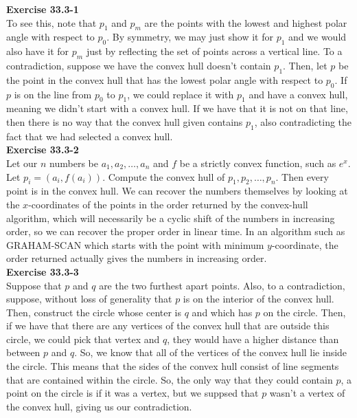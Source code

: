 \documentclass{article}
\begin{document}
\noindent\textbf{Exercise 33.3-1}\\

To see this, note that $p_1$ and $p_m$ are the points with the lowest and highest polar angle with respect to $p_0$. By symmetry, we may just show it for $p_1$ and we would also have it for $p_m$ just by reflecting the set of points across a vertical line. To a contradiction, suppose we have the convex hull doesn't contain $p_1$. Then, let $p$ be the point in the convex hull that has the lowest polar angle with respect to $p_0$. If $p$ is on the line from $p_0$ to $p_1$, we could replace it with $p_1$ and have a convex hull, meaning we didn't start with a convex hull. If we have that it is not on that line, then there is no way that the convex hull given contains $p_1$, also contradicting the fact that we had selected a convex hull.\\

\noindent\textbf{Exercise 33.3-2}\\

Let our $n$ numbers be $a_1, a_2, \ldots, a_n$ and $f$ be a strictly convex function, such as $e^x$.  Let $p_i = (a_i, f(a_i))$.  Compute the convex hull of $p_1, p_2, \ldots, p_n$.  Then every point is in the convex hull.  We can recover the numbers themselves by looking at the $x$-coordinates of the points in the order returned by the convex-hull algorithm, which will necessarily be a cyclic shift of the numbers in increasing order, so we can recover the proper order in linear time.  In an algorithm such as GRAHAM-SCAN which starts with the point with minimum $y$-coordinate, the order returned actually gives the numbers in increasing order.  \\

\noindent\textbf{Exercise 33.3-3}\\

Suppose that $p$ and $q$ are the two furthest apart points. Also, to a contradiction, suppose, without loss of generality that $p$ is on the interior of the convex hull. Then, construct the circle whose center is $q$ and which has $p$ on the circle. Then, if we have that there are any vertices of the convex hull that are outside this circle, we could pick that vertex and $q$, they would have a higher distance than between $p$ and $q$. So, we know that all of the vertices of the convex hull lie inside the circle. This means that the sides of the convex hull consist of line segments that are contained within the circle. So, the only way that they could contain $p$, a point on the circle is if it was a vertex, but we suppsed that $p$ wasn't a vertex of the convex hull, giving us our contradiction.\\
\end{document}
